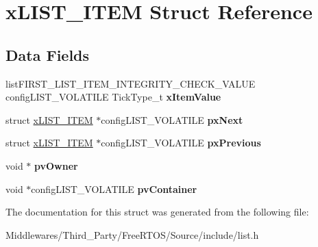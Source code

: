 \hypertarget{structx_l_i_s_t___i_t_e_m}{}\section{x\+L\+I\+S\+T\+\_\+\+I\+T\+EM Struct Reference}
\label{structx_l_i_s_t___i_t_e_m}
\subsection*{Data Fields}
\begin{DoxyCompactItemize}
\item 
\mbox{\label{structx_l_i_s_t___i_t_e_m_aa6f3caf3e73107fb0da6fede4b06f104}} 
list\+F\+I\+R\+S\+T\+\_\+\+L\+I\+S\+T\+\_\+\+I\+T\+E\+M\+\_\+\+I\+N\+T\+E\+G\+R\+I\+T\+Y\+\_\+\+C\+H\+E\+C\+K\+\_\+\+V\+A\+L\+UE config\+L\+I\+S\+T\+\_\+\+V\+O\+L\+A\+T\+I\+LE Tick\+Type\+\_\+t {\bfseries x\+Item\+Value}
\item 
\mbox{\label{structx_l_i_s_t___i_t_e_m_a77927cd93dda0c59b3855aca58881ca1}} 
struct \mbox{\hyperlink{structx_l_i_s_t___i_t_e_m}{x\+L\+I\+S\+T\+\_\+\+I\+T\+EM}} $\ast$config\+L\+I\+S\+T\+\_\+\+V\+O\+L\+A\+T\+I\+LE {\bfseries px\+Next}
\item 
\mbox{\label{structx_l_i_s_t___i_t_e_m_a0294e93ecc18bcdb723038af1027505d}} 
struct \mbox{\hyperlink{structx_l_i_s_t___i_t_e_m}{x\+L\+I\+S\+T\+\_\+\+I\+T\+EM}} $\ast$config\+L\+I\+S\+T\+\_\+\+V\+O\+L\+A\+T\+I\+LE {\bfseries px\+Previous}
\item 
\mbox{\label{structx_l_i_s_t___i_t_e_m_aeb54d184fbcccb5748e66cb2426e3b3f}} 
void $\ast$ {\bfseries pv\+Owner}
\item 
\mbox{\label{structx_l_i_s_t___i_t_e_m_a0a7b95bc338d7d9df18e10607893d103}} 
void $\ast$config\+L\+I\+S\+T\+\_\+\+V\+O\+L\+A\+T\+I\+LE {\bfseries pv\+Container}
\end{DoxyCompactItemize}


The documentation for this struct was generated from the following file\+:\begin{DoxyCompactItemize}
\item 
Middlewares/\+Third\+\_\+\+Party/\+Free\+R\+T\+O\+S/\+Source/include/list.\+h\end{DoxyCompactItemize}
